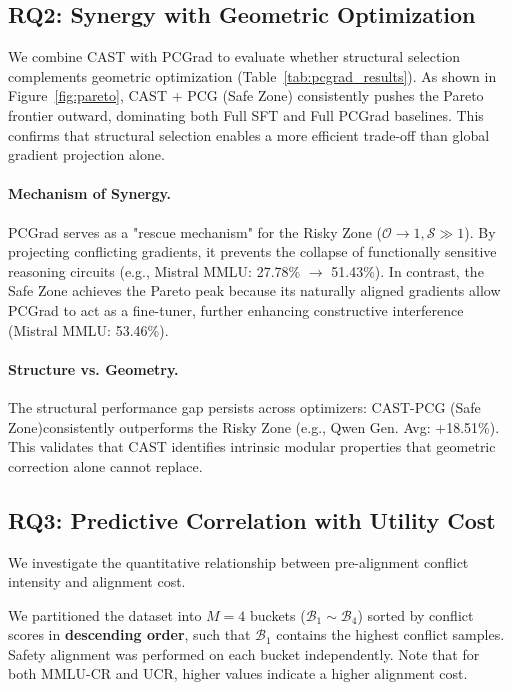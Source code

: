 \documentclass[11pt]{article}
\begin{document}
\subsection{RQ2: Synergy with Geometric Optimization}
\label{sec:rq2_synergy}

We combine CAST with PCGrad to evaluate whether structural selection complements geometric optimization (Table~\ref{tab:pcgrad_results}). As shown in Figure~\ref{fig:pareto}, CAST + PCG (Safe Zone) consistently pushes the Pareto frontier outward, dominating both Full SFT and Full PCGrad baselines. This confirms that structural selection enables a more efficient trade-off than global gradient projection alone.

\paragraph{Mechanism of Synergy.}
PCGrad serves as a "rescue mechanism" for the Risky Zone ($\mathcal{O} \to 1, \mathcal{S} \gg 1$). By projecting conflicting gradients, it prevents the collapse of functionally sensitive reasoning circuits (e.g., Mistral MMLU: 27.78\% $\to$ 51.43\%). In contrast, the Safe Zone achieves the Pareto peak because its naturally aligned gradients allow PCGrad to act as a fine-tuner, further enhancing constructive interference (Mistral MMLU: 53.46\%).

\paragraph{Structure vs. Geometry.}
The structural performance gap persists across optimizers: CAST-PCG (Safe Zone)consistently outperforms the Risky Zone (e.g., Qwen Gen. Avg: +18.51\%). This validates that CAST identifies intrinsic modular properties that geometric correction alone cannot replace. 


\subsection{RQ3: Predictive Correlation with Utility Cost}
\label{sec:rq3}

We investigate the quantitative relationship between pre-alignment conflict intensity and alignment cost. 

We partitioned the dataset into $M=4$ buckets ($\mathcal{B}_1 \sim \mathcal{B}_4$) sorted by conflict scores in \textbf{descending order}, such that $\mathcal{B}_1$ contains the highest conflict samples. Safety alignment was performed on each bucket independently. Note that for both MMLU-CR and UCR, higher values indicate a higher alignment cost.
\end{document}
